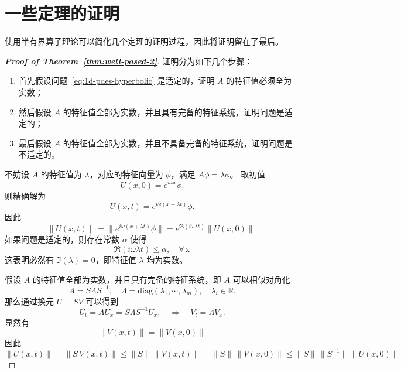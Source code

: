 \section{一些定理的证明}

使用半有界算子理论可以简化几个定理的证明过程，因此将证明留在了最后。

\begin{proof}[\normalfont\bfseries Proof of Theorem~\ref{thm:well-posed-2}]
    证明分为如下几个步骤：
    \begin{enumerate}
        \item 首先假设问题~\eqref{eq:1d-pdes-hyperbolic} 是适定的，证明 $A$ 的特征值必须全为实数；
        \item 然后假设 $A$ 的特征值全部为实数，并且具有完备的特征系统，证明问题是适定的；
        \item 最后假设 $A$ 的特征值全部为实数，并且不具备完备的特征系统，证明问题是不适定的。
    \end{enumerate}

    不妨设 $A$ 的特征值为 $\lambda$，对应的特征向量为 $\phi$，满足 $A \phi = \lambda \phi$。
    取初值
    \[
        U(x,0) = e^{i \omega x} \phi.
    \]
    则精确解为
    \[
        U(x,t) = e^{i \omega (x + \lambda t)} \phi.
    \]
    因此
    \[
        \| U(x,t) \| = \| e^{i \omega (x + \lambda t)} \phi \| = e^{\Re(i \omega \lambda t)} \| U(x,0) \|.
    \]
    如果问题是适定的，则存在常数 $\alpha$ 使得
    \[
        \Re(i \omega \lambda t) \le \alpha,\quad \forall\, \omega
    \]
    这表明必然有 $\Im(\lambda) = 0$，即特征值 $\lambda$ 均为实数。

    假设 $A$ 的特征值全部为实数，并且具有完备的特征系统，即 $A$ 可以相似对角化
    \[
        A = S \Lambda S^{-1},\quad \Lambda = \text{diag}(\lambda_1, \cdots, \lambda_m),\quad \lambda_i \in \mathbb{R}.
    \]
    那么通过换元 $U = S V$ 可以得到
    \[
        U_t = A U_x = S \Lambda S^{-1} U_x, \quad \Rightarrow \quad V_t = \Lambda V_x.
    \]
    显然有
    \[
        \| V(x,t) \| = \| V(x,0) \|
    \]
    因此
    \[
        \| U(x,t) \| = \| S\,V(x,t) \| \le \| S \|\,\| V(x,t) \| = \| S \|\,\| V(x,0) \|
        \le  \| S \|\, \| S^{-1} \|\,\| U(x,0) \|
    \]


\end{proof}
